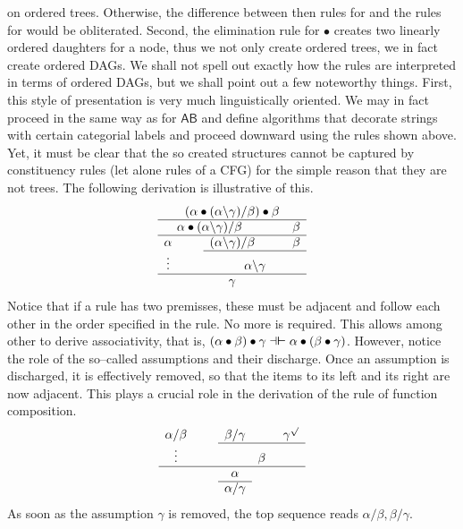 on ordered trees. Otherwise, the difference between then rules 
for {\mtt\tf} and the rules for {\mtt\tb} would be obliterated.
Second, the elimination rule for $\bullet$ creates two linearly
ordered daughters for a node, thus we not only create ordered
trees, we in fact create ordered DAGs. We shall not spell out
exactly how the rules are interpreted in terms of ordered DAGs,
but we shall point out a few noteworthy things. First, this style of
presentation is very much linguistically oriented. We may in fact
proceed in the same way as for $\mathsf{AB}$ and define algorithms that
decorate strings with certain categorial labels and proceed
downward using the rules shown above. Yet, it must be clear that
the so created structures cannot be captured by constituency rules
(let alone rules of a CFG) for the simple reason
that they are not trees. The following derivation is
illustrative of this.
\begin{equation}
\begin{array}{ccccc}
\multicolumn{5}{c}{(\alpha \bullet (\alpha\backslash\gamma)/\beta) %
\bullet \beta} \\\hline
\multicolumn{3}{c}{\alpha \bullet (\alpha\backslash\gamma)/\beta}
    & \quad & \beta \\\hline
\alpha & \quad & (\alpha \backslash\gamma)/\beta & \quad & \beta
    \\\cline{3-5}
\vdots  &       & \multicolumn{3}{c}{\alpha\backslash\gamma}
\\\hline \multicolumn{5}{c}{\gamma}
\end{array}
\end{equation}
Notice that if a rule has two premisses, these must be adjacent
and follow each other in the order specified in the rule. No more
is required. This allows among other to derive associativity, that
is, $(\alpha \bullet\beta) \bullet \gamma \dashv\boldsymbol{\vdash} \alpha
\bullet (\beta \bullet\gamma)$. However, notice the role of the
so--called assumptions and their discharge. Once an assumption is
discharged, it is effectively removed, so that the items to its
left and its right are now adjacent. This plays a crucial role in
the derivation of the rule of function composition.
\begin{equation}
\begin{array}{ccccc}
\alpha/\beta & \quad & \beta/\gamma & \quad & \gamma^{\surd}
    \\\cline{3-5}
\vdots       &       & \multicolumn{3}{c}{\beta} \\\cline{1-5}
             &       &    \alpha    &       & \\\cline{3-3}
             &       & \alpha/\gamma &      &
\end{array}
\end{equation}
As soon as the assumption $\gamma$ is removed, the top sequence
reads $\alpha/\beta, \beta/\gamma$.

